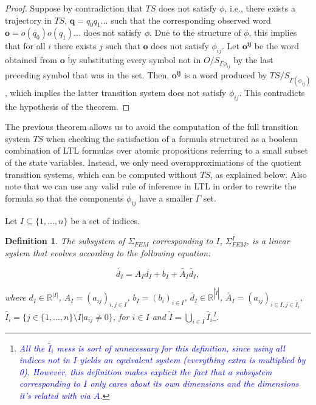 \documentclass{article}
\newtheorem{definition}{Definition}
\newcommand*{\R}{\mathbb{R}}
\newcommand*{\fran}[1]{\textcolor{blue}{#1}}
\begin{document}
\begin{proof}

Suppose by contradiction that $TS$ does not satisfy $\phi$, i.e., there exists a
trajectory in $TS$, $\mathbf{q} = q_0 q_1...$ such that the corresponding observed
word $\mathbf{o} = o(q_0) o(q_1)...$ does not satisfy $\phi$. Due to the structure
of $\phi$, this implies that for all $i$ there exists $j$ such that $\mathbf{o}$ does
not satisfy $\phi_{ij}$. Let $\mathbf{o^{ij}}$ be the word obtained from
$\mathbf{o}$ by substituting every symbol not in $O/S_{\Gamma{\phi_{ij}}}$ by
the last preceding symbol that was in the set. Then, $\mathbf{o^{ij}}$ is a word
produced by $TS/S_{\Gamma(\phi_{ij})}$, which implies the latter transition system
does not satisfy $\phi_{ij}$. This contradicts the hypothesis of the
theorem.
    
\end{proof}

The previous theorem allows us to avoid the computation of the full transition
system $TS$ when checking the satisfaction of a formula structured as a boolean
combination of LTL formulas over atomic propositions referring to a small subset
of the state variables. Instead, we only need overapproximations of the quotient
transition systems, which can be computed without $TS$, as explained below. Also
note that we can use any valid rule of inference in LTL in order to rewrite the
formula so that the components $\phi_{ij}$ have a smaller $\Gamma$ set.

Let $I \subseteq \{1,...,n\}$ be a set of indices. 

\begin{definition}

The subsystem of $\Sigma_{FEM}$ corresponding to $I$,
$\Sigma_{FEM}^I$, is a linear system that evolves according to the following
equation:

\begin{equation}
    \dot{d_I} = A_I d_I + b_I + \tilde{A_I}\tilde{d_I},
\end{equation}

where $d_I \in \R^{|I|}$, $A_I = (a_{ij})_{i, j \in I}$, $b_I = (b_i)_{i
\in I}$, $\tilde{d_I} \in \R^{|\tilde{I}|} $, $\tilde{A_I} = (a_{ij})_{i \in I, j
\in \tilde{I_i}}$, $\tilde{I_i} = \{j \in \{1,...,n\} \setminus I | a_{ij} \neq 0\}$, for $i
\in I$ and $\tilde{I} = \bigcup_{i \in I} \tilde{I_i}$\footnote{\fran{All the
$\tilde{I_i}$ mess is sort of unnecessary for this definition, since using all
indices not in $I$ yields an equivalent system (everything extra is multiplied
by 0). However, this definition makes explicit the fact that a subsystem
corresponding to $I$ only cares about its own dimensions and the dimensions it's
related with via $A$.}}.

\end{definition}
\end{document}
